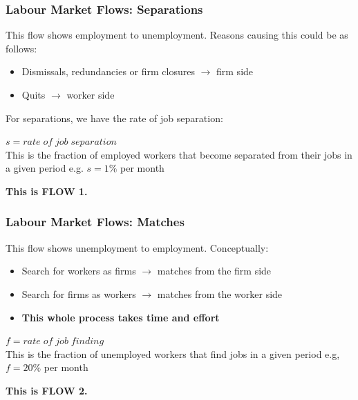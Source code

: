 \documentclass[12pt, letterpaper]{article}
\begin{document}
\subsubsection{Labour Market Flows: Separations}
This flow shows employment to unemployment. Reasons causing this could be as follows:
\begin{itemize}
	\item Dismissals, redundancies or firm closures $\rightarrow$ firm side
	\item Quits $\rightarrow$ worker side
\end{itemize}
For separations, we have the rate of job separation:
\begin{center}
	$s = rate\;of\;job\;separation$\\
	This is the fraction of employed workers that become separated from their jobs in a given period e.g. $s = 1\%$ per month
\end{center}
\textbf{This is FLOW 1.}

\subsubsection{Labour Market Flows: Matches}
This flow shows unemployment to employment. Conceptually:
\begin{itemize}
	\item Search for workers as firms $\rightarrow$ matches from the firm side
	\item Search for firms as workers $\rightarrow$ matches from the worker side
	\item \textbf{This whole process takes time and effort}
\end{itemize}
\begin{center}
	$f = rate\;of\;job\;finding$\\
	This is the fraction of unemployed workers that find jobs in a given period e.g, $f = 20\%$ per month
\end{center}
\textbf{This is FLOW 2.}
\end{document}
